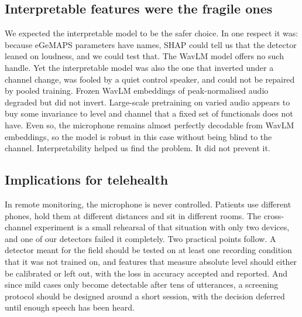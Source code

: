 \documentclass[conference]{IEEEtran}
\begin{document}
\subsection{Interpretable features were the fragile ones}
We expected the interpretable model to be the safer choice. In one respect it was: because eGeMAPS parameters have names, SHAP could tell us that the detector leaned on loudness, and we could test that. The WavLM model offers no such handle. Yet the interpretable model was also the one that inverted under a channel change, was fooled by a quiet control speaker, and could not be repaired by pooled training. Frozen WavLM embeddings of peak-normalised audio degraded but did not invert. Large-scale pretraining on varied audio appears to buy some invariance to level and channel that a fixed set of functionals does not have. Even so, the microphone remains almost perfectly decodable from WavLM embeddings, so the model is robust in this case without being blind to the channel. Interpretability helped us find the problem. It did not prevent it.

\subsection{Implications for telehealth}
In remote monitoring, the microphone is never controlled. Patients use different phones, hold them at different distances and sit in different rooms. The cross-channel experiment is a small rehearsal of that situation with only two devices, and one of our detectors failed it completely. Two practical points follow. A detector meant for the field should be tested on at least one recording condition that it was not trained on, and features that measure absolute level should either be calibrated or left out, with the loss in accuracy accepted and reported. And since mild cases only become detectable after tens of utterances, a screening protocol should be designed around a short session, with the decision deferred until enough speech has been heard.
\end{document}
